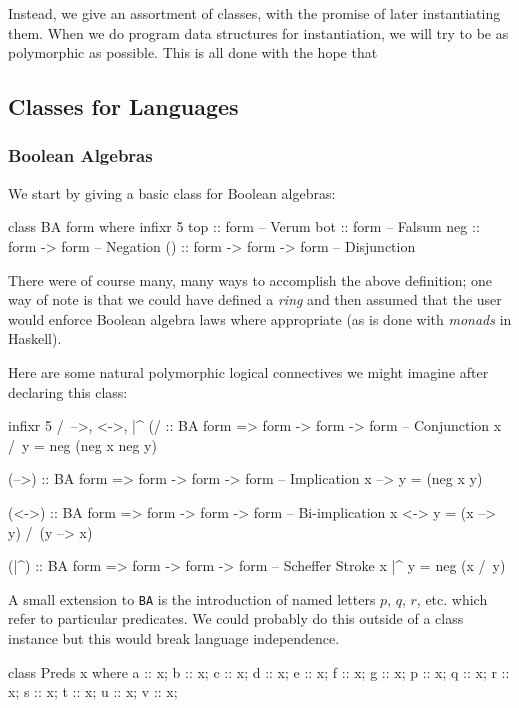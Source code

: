 \documentclass[11pt]{article}
\theoremstyle{definition}
\begin{document}
Instead, we give an assortment of classes, with the promise of later instantiating them.  When we do program data structures for instantiation, we will try to be as polymorphic as possible.  This is all done with the hope that 

\subsection{Classes for Languages}
\subsubsection{Boolean Algebras}

We start by giving a basic class for Boolean algebras:

\begin{code}
class BA form where
  infixr 5 \/
  top :: form                       -- Verum
  bot :: form                       -- Falsum
  neg ::  form -> form              -- Negation
  (\/) ::  form -> form -> form     -- Disjunction
\end{code}

There were of course many, many ways to accomplish the above definition; one way of note is that we could have defined a \emph{ring} and then assumed that the user would enforce Boolean algebra laws where appropriate (as is done with \emph{monads} in Haskell).

Here are some natural polymorphic logical connectives we might imagine after declaring this class:

\begin{code}
infixr 5 /\, -->, <->, |^
(/\) ::  BA form => form -> form -> form     -- Conjunction
x /\ y = neg (neg x \/ neg y)  

(-->) :: BA form => form -> form -> form     -- Implication
x --> y = (neg x \/ y)

(<->) :: BA form => form -> form -> form     -- Bi-implication
x <-> y = (x --> y) /\ (y --> x)

(|^) :: BA form => form -> form -> form      -- Scheffer Stroke
x |^ y = neg (x /\ y)
\end{code}

A small extension to \texttt{BA} is the introduction of named letters $p$, $q$, $r$, etc. which refer to particular predicates.  We could probably do this outside of a class instance but this would break language independence.

\begin{code}
class Preds x where
  a :: x; b :: x; c :: x; d :: x; e :: x; f :: x; g :: x;
  p :: x; q :: x; r :: x; s :: x; t :: x; u :: x; v :: x;
\end{code}
\end{document}
